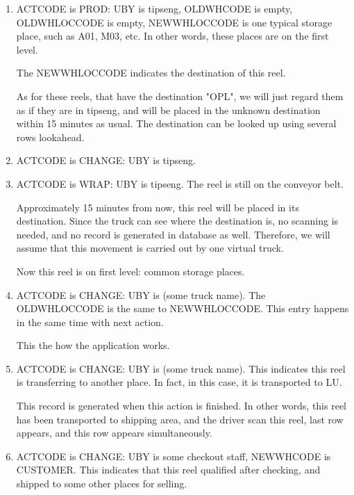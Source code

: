 \documentclass[a4paper]{report}
\begin{document}
\begin{enumerate}
	\item
	ACTCODE is PROD: UBY is tipseng, OLDWHCODE is empty, OLDWHLOCCODE is empty, NEWWHLOCCODE is one typical storage place, such as A01, M03, etc.
	In other words, these places are on the first level.

	The NEWWHLOCCODE indicates the destination of this reel.

	As for these reels, that have the destination "OPL", we will just regard them as if they are in tipseng, and will be placed in the unknown 
	destination within 15 minutes as usual. The destination can be looked up using several rows lookahead.
	\item
	ACTCODE is CHANGE: UBY is tipseng.
	\item
	ACTCODE is WRAP: UBY is tipseng. The reel is still on the conveyor belt.

	Approximately 15 minutes from now, this reel will be placed in its destination. Since the truck can see where the destination is, no scanning is 
	needed, and no record is generated in database as well. Therefore, we will assume that this movement is carried out by one virtual truck.

	Now this reel is on first level: common storage places.
	\item
	ACTCODE is CHANGE: UBY is (some truck name). The OLDWHLOCCODE is the same to NEWWHLOCCODE. This entry happens in the same time with next action.

	This the how the application works.
	\item
	ACTCODE is CHANGE: UBY is (some truck name). This indicates this reel is transferring to another place. In fact, in this case, it is transported 
	to LU.

	This record is generated when this action is finished. In other words, this reel has been transported to shipping area, and the driver scan this 
	reel, last row appears, and this row appears simultaneously.
	\item
	ACTCODE is CHANGE: UBY is some checkout staff, NEWWHCODE is CUSTOMER. This indicates that this reel qualified after checking, and shipped to some 
	other places for selling.

	\end{enumerate}
\end{document}
